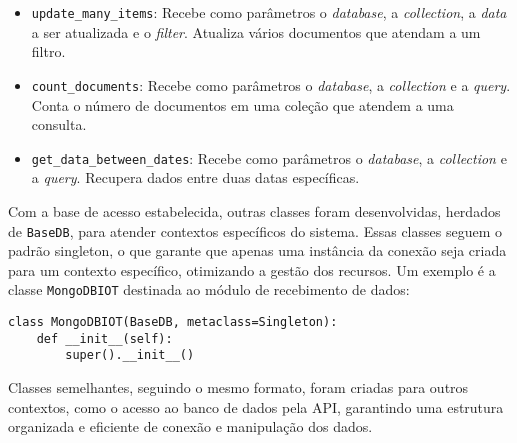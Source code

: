 \begin{itemize}
    \item \texttt{update\_many\_items}: Recebe como parâmetros o \textit{database}, a \textit{collection}, a \textit{data} a ser atualizada e o \textit{filter}. Atualiza vários documentos que atendam a um filtro.
    
    \item \texttt{count\_documents}: Recebe como parâmetros o \textit{database}, a \textit{collection} e a \textit{query}. Conta o número de documentos em uma coleção que atendem a uma consulta.
    
    \item \texttt{get\_data\_between\_dates}: Recebe como parâmetros o \textit{database}, a \textit{collection} e a \textit{query}. Recupera dados entre duas datas específicas.
\end{itemize}


Com a base de acesso estabelecida, outras classes foram desenvolvidas, herdados de \texttt{BaseDB}, para atender contextos específicos do sistema. Essas classes seguem o padrão singleton, o que garante que apenas uma instância da conexão seja criada para um contexto específico, otimizando a gestão dos recursos. Um exemplo é a classe \texttt{MongoDBIOT} destinada ao módulo de recebimento de dados:

\begin{verbatim}
class MongoDBIOT(BaseDB, metaclass=Singleton):
    def __init__(self):
        super().__init__()
\end{verbatim}

Classes semelhantes, seguindo o mesmo formato, foram criadas para outros contextos, como o acesso ao banco de dados pela API, garantindo uma estrutura organizada e eficiente de conexão e manipulação dos dados.